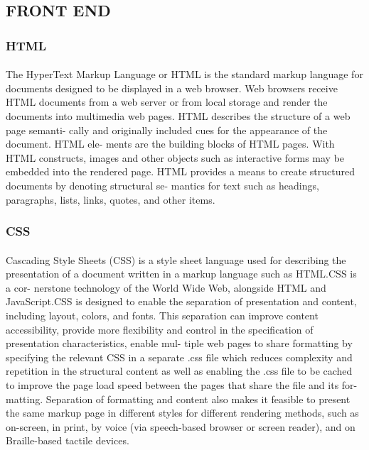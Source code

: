 \subsection{FRONT END}
\subsubsection{HTML}
\paragraph{} The HyperText Markup Language or HTML is the standard markup language for documents designed to be displayed in a web browser. Web browsers receive HTML documents from a web server or from local storage and render the documents into multimedia web pages. HTML describes the structure of a web page semanti- cally and originally included cues for the appearance of the document. HTML ele- ments are the building blocks of HTML pages. With HTML constructs, images and other objects such as interactive forms may be embedded into the rendered page. HTML provides a means to create structured documents by denoting structural se- mantics for text such as headings, paragraphs, lists, links, quotes, and other items.
\subsubsection{CSS}
\paragraph{} Cascading Style Sheets (CSS) is a style sheet language used for describing the presentation of a document written in a markup language such as HTML.CSS is a cor- nerstone technology of the World Wide Web, alongside HTML and JavaScript.CSS is designed to enable the separation of presentation and content, including layout, colors, and fonts. This separation can improve content accessibility, provide more flexibility and control in the specification of presentation characteristics, enable mul- tiple web pages to share formatting by specifying the relevant CSS in a separate .css file which reduces complexity and repetition in the structural content as well as enabling the .css file to be cached to improve the page load speed between the pages that share the file and its for- matting. Separation of formatting and content also makes it feasible to present the same markup page in different styles for different rendering methods, such as on-screen, in print, by voice (via speech-based browser or screen reader), and on Braille-based tactile devices.

